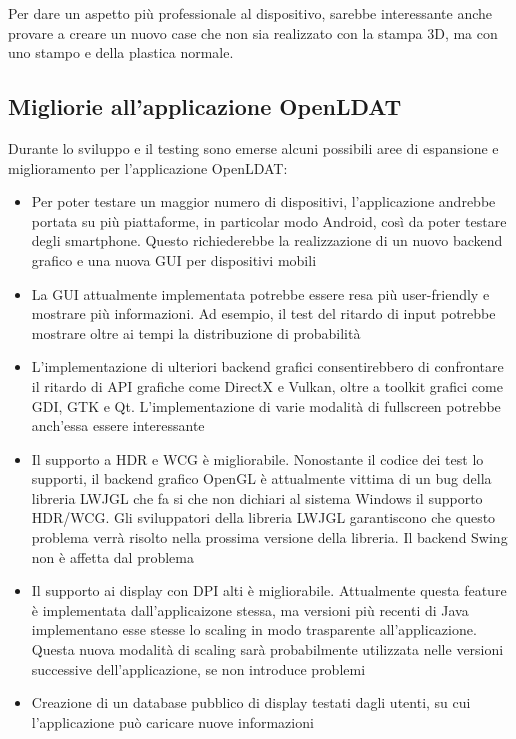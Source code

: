 Per dare un aspetto più professionale al dispositivo, sarebbe interessante anche provare a creare un nuovo case che non sia realizzato con la stampa 3D, ma con uno stampo e della plastica normale.

\subsection{Migliorie all'applicazione OpenLDAT}
Durante lo sviluppo e il testing sono emerse alcuni possibili aree di espansione e miglioramento per l'applicazione OpenLDAT:\begin{itemize}
	\item Per poter testare un maggior numero di dispositivi, l'applicazione andrebbe portata su più piattaforme, in particolar modo Android, così da poter testare degli smartphone. Questo richiederebbe la realizzazione di un nuovo backend grafico e una nuova GUI per dispositivi mobili
	\item La GUI attualmente implementata potrebbe essere resa più user-friendly e mostrare più informazioni. Ad esempio, il test del ritardo di input potrebbe mostrare oltre ai tempi la distribuzione di probabilità
	\item L'implementazione di ulteriori backend grafici consentirebbero di confrontare il ritardo di API grafiche come DirectX e Vulkan, oltre a toolkit grafici come GDI, GTK e Qt. L'implementazione di varie modalità di fullscreen potrebbe anch'essa essere interessante
	\item Il supporto a HDR e WCG è migliorabile. Nonostante il codice dei test lo supporti, il backend grafico OpenGL è attualmente vittima di un bug della libreria LWJGL che fa si che non dichiari al sistema Windows il supporto HDR/WCG. Gli sviluppatori della libreria LWJGL garantiscono che questo problema verrà risolto nella prossima versione della libreria. Il backend Swing non è affetta dal problema
	\item Il supporto ai display con DPI alti è migliorabile. Attualmente questa feature è implementata dall'applicaizone stessa, ma versioni più recenti di Java implementano esse stesse lo scaling in modo trasparente all'applicazione. Questa nuova modalità di scaling sarà probabilmente utilizzata nelle versioni successive dell'applicazione, se non introduce problemi
	\item Creazione di un database pubblico di display testati dagli utenti, su cui l'applicazione può caricare nuove informazioni
\end{itemize}

